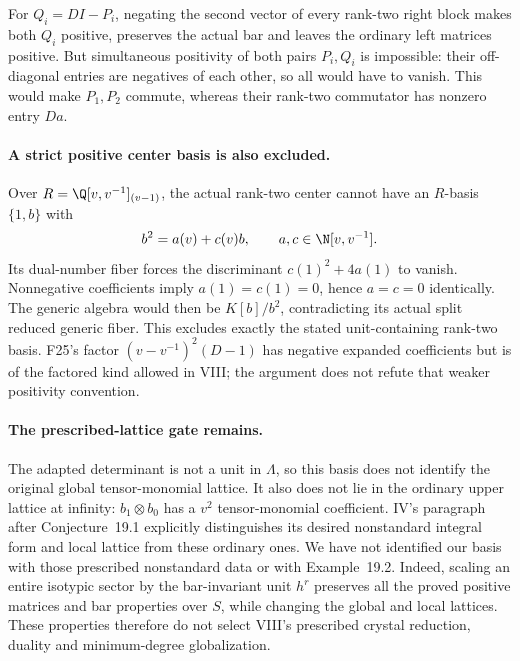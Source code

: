 For $Q_i=DI-P_i$, negating the second vector of every rank-two
right block makes both $Q_i$ positive, preserves the actual bar
and leaves the ordinary left matrices positive.
But simultaneous positivity of both pairs $P_i,Q_i$ is impossible:
their off-diagonal entries are negatives of each other, so all
would have to vanish. This would make $P_1,P_2$ commute, whereas
their rank-two commutator has nonzero entry $Da$.

\paragraph{A strict positive center basis is also excluded.}
Over $R=\Q[v,v^{-1}]_{(v-1)}$, the actual rank-two center cannot
have an $R$-basis $\{1,b\}$ with
\[
 b^2=a(v)+c(v)b,\qquad a,c\in\N[v,v^{-1}].
\]
Its dual-number fiber forces the discriminant
$c(1)^2+4a(1)$ to vanish. Nonnegative coefficients imply
$a(1)=c(1)=0$, hence $a=c=0$ identically.
The generic algebra would then be $K[b]/b^2$, contradicting its
actual split reduced generic fiber. This excludes exactly the
stated unit-containing rank-two basis. F25's factor
$(v-v^{-1})^2(D-1)$ has negative expanded coefficients but is of
the factored kind allowed in VIII; the argument does not refute
that weaker positivity convention.

\paragraph{The prescribed-lattice gate remains.}
The adapted determinant is not a unit in $\Lambda$, so this basis
does not identify the original global tensor-monomial lattice.
It also does not lie in the ordinary upper lattice at infinity:
$b_1\otimes b_0$ has a $v^2$ tensor-monomial coefficient.
IV's paragraph after Conjecture~19.1 explicitly distinguishes its
desired nonstandard integral form and local lattice from these
ordinary ones. We have not identified our basis with those
prescribed nonstandard data or with Example~19.2.
Indeed, scaling an entire isotypic sector by the bar-invariant
unit $h^r$ preserves all the proved positive matrices and bar
properties over $S$, while changing the global and local lattices.
These properties therefore do not select VIII's prescribed
crystal reduction, duality and minimum-degree globalization.

